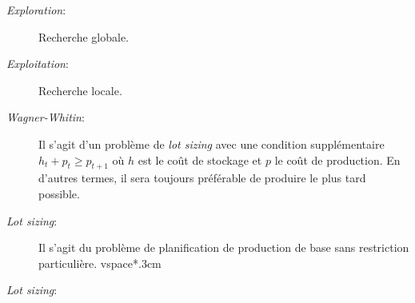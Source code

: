 \documentclass[12pt,a4paper]{article}
\begin{document}
\begin{description}
		\item[\emph{Exploration}:] Recherche globale.
		\vspace*{.3cm}
		\item[\emph{Exploitation}:] Recherche locale.
		\vspace*{.3cm}
		\item[\emph{Wagner-Whitin}:] Il s'agit d'un problème de \emph{lot sizing} avec une condition supplémentaire $h_{t} + p_{t} \geq p_{t+1}$ où $h$ est le coût de stockage et $p$ le coût de production. En d'autres termes, il sera toujours préférable de produire le plus tard possible.
		\vspace*{.3cm}
		\item[\emph{Lot sizing}:] Il s'agit du problème de planification de production de base sans restriction particulière.
		vspace*{.3cm}
		\item[\emph{Lot sizing}:]
		
	\end{description}
\end{document}

